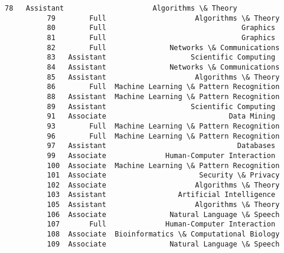 \documentclass[11pt]{article}
\begin{document}
\begin{Verbatim}[commandchars=\\\{\}]
          78   Assistant                     Algorithms \& Theory   
          79        Full                     Algorithms \& Theory   
          80        Full                                Graphics   
          81        Full                                Graphics   
          82        Full               Networks \& Communications   
          83   Assistant                    Scientific Computing   
          84   Assistant               Networks \& Communications   
          85   Assistant                     Algorithms \& Theory   
          86        Full  Machine Learning \& Pattern Recognition   
          88   Assistant  Machine Learning \& Pattern Recognition   
          89   Assistant                    Scientific Computing   
          91   Associate                             Data Mining   
          93        Full  Machine Learning \& Pattern Recognition   
          96        Full  Machine Learning \& Pattern Recognition   
          97   Assistant                               Databases   
          99   Associate              Human-Computer Interaction   
          100  Associate  Machine Learning \& Pattern Recognition   
          101  Associate                      Security \& Privacy   
          102  Associate                     Algorithms \& Theory   
          103  Assistant                 Artificial Intelligence   
          105  Assistant                     Algorithms \& Theory   
          106  Associate               Natural Language \& Speech   
          107       Full              Human-Computer Interaction   
          108  Associate  Bioinformatics \& Computational Biology   
          109  Associate               Natural Language \& Speech   
          

\end{Verbatim}
\end{document}

